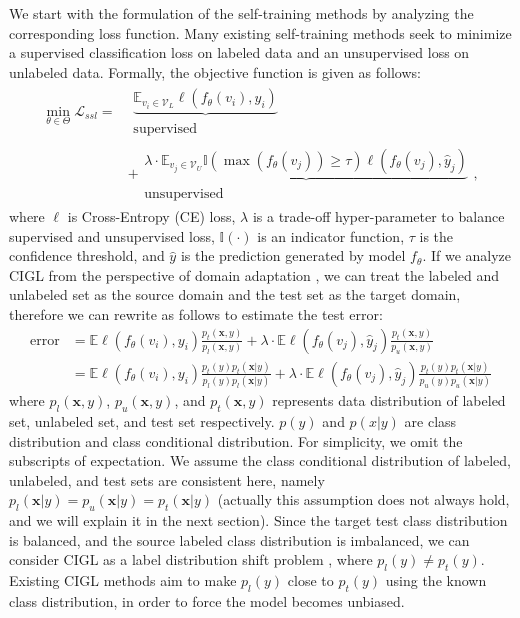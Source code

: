 We start with the formulation of the self-training methods by analyzing the corresponding loss function. Many existing self-training methods seek to minimize a supervised classification loss on labeled data and an unsupervised loss on unlabeled data. Formally, the objective function is given as follows:
\begin{equation}
\label{equ:ssl}
\begin{aligned}
    \mathop{\min}\limits_{\theta\in\Theta}\mathcal{L}_{ssl}=&\begin{matrix}\underbrace{\mathbb{E}_{v_i\in\mathcal{V}_L}\ell(f_\theta(v_i), y_i)} \\ \text{supervised}\end{matrix} \\
    &+\begin{matrix}\underbrace{\lambda\cdot\mathbb{E}_{v_j\in\mathcal{V}_U}\mathbb{I}(\max(f_\theta(v_j))\geq\tau)\ell(f_\theta(v_j), \hat{y}_j)}\\ \text{unsupervised}\end{matrix},
\end{aligned}
\end{equation}
where $\ell$ is Cross-Entropy (CE) loss, $\lambda$ is a trade-off hyper-parameter to balance supervised and unsupervised loss, $\mathbb{I(\cdot)}$ is an indicator function, $\tau$ is the confidence threshold, and $\hat{y}$ is the prediction generated by model $f_\theta$. If we analyze CIGL from the perspective of domain adaptation \cite{jamal2020rethinking}, we can treat the labeled and unlabeled set as the source domain and the test set as the target domain, therefore we can rewrite  as follows to estimate the test error:
\begin{equation}
\label{equ:domain}
\begin{aligned}
    \text{error}&=\mathbb{E}\ell(f_\theta(v_i),y_i)\frac{p_t(\mathbf{x},y)}{p_l(\mathbf{x},y)} + \lambda\cdot\mathbb{E}\ell(f_\theta(v_j),\hat{y}_j)\frac{p_t(\mathbf{x},y)}{p_u(\mathbf{x},y)} \\
    &=\mathbb{E}\ell(f_\theta(v_i),y_i)\frac{p_t(y)p_t(\mathbf{x}|y)}{p_l(y)p_l(\mathbf{x}|y)}+\lambda\cdot\mathbb{E}\ell(f_\theta(v_j),\hat{y}_j)\frac{p_t(y)p_t(\mathbf{x}|y)}{p_u(y)p_u(\mathbf{x}|y)}
\end{aligned}
\end{equation}
where $p_l(\mathbf{x},y)$, $p_u(\mathbf{x},y)$, and $p_t(\mathbf{x},y)$ represents data distribution of labeled set, unlabeled set, and test set respectively. $p(y)$ and $p(x|y)$ are class distribution and class conditional distribution. For simplicity, we omit the subscripts of expectation. We assume the class conditional distribution of labeled, unlabeled, and test sets are consistent here, namely $p_l(\mathbf{x}|y)=p_u(\mathbf{x}|y)=p_t(\mathbf{x}|y)$ (actually this assumption does not always hold, and we will explain it in the next section). Since the target test class distribution is balanced, and the source labeled class distribution is imbalanced, we can consider CIGL as a label distribution shift problem \cite{hong2021disentangling,garg2020unified}, where $p_l(y)\neq p_t(y)$. Existing CIGL methods aim to make $p_l(y)$ close to $p_t(y)$ using the known class distribution, in order to force the model becomes unbiased. 


